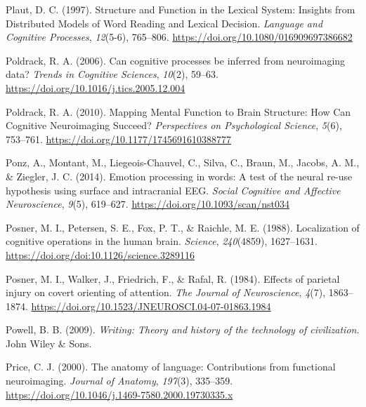 \documentclass[
  a4paper,12pt,twoside,onecolumn,openright,final,oldfontcommands]{memoir}
\newlength{\cslhangindent}
\newlength{\cslentryspacingunit} %
\newenvironment{CSLReferences}[2] %
 {%
  \setlength{\parindent}{0pt}
  \ifodd #1
  \let\oldpar\par
  \def\par{\hangindent=\cslhangindent\oldpar}
  \fi
  \setlength{\parskip}{#2\cslentryspacingunit}
 }%
 {}
\begin{document}
\begin{CSLReferences}{1}{0}
\leavevmode{}%
Plaut, D. C. (1997). Structure and {Function} in the {Lexical} {System}: {Insights} from {Distributed} {Models} of {Word} {Reading} and {Lexical} {Decision}. \emph{Language and Cognitive Processes}, \emph{12}(5-6), 765--806. \url{https://doi.org/10.1080/016909697386682}

\leavevmode{}%
Poldrack, R. A. (2006). Can cognitive processes be inferred from neuroimaging data? \emph{Trends in Cognitive Sciences}, \emph{10}(2), 59--63. \url{https://doi.org/10.1016/j.tics.2005.12.004}

\leavevmode{}%
Poldrack, R. A. (2010). Mapping {Mental} {Function} to {Brain} {Structure}: {How} {Can} {Cognitive} {Neuroimaging} {Succeed}? \emph{Perspectives on Psychological Science}, \emph{5}(6), 753--761. \url{https://doi.org/10.1177/1745691610388777}

\leavevmode{}%
Ponz, A., Montant, M., Liegeois-Chauvel, C., Silva, C., Braun, M., Jacobs, A. M., \& Ziegler, J. C. (2014). Emotion processing in words: A test of the neural re-use hypothesis using surface and intracranial {EEG}. \emph{Social Cognitive and Affective Neuroscience}, \emph{9}(5), 619--627. \url{https://doi.org/10.1093/scan/nst034}

\leavevmode{}%
Posner, M. I., Petersen, S. E., Fox, P. T., \& Raichle, M. E. (1988). Localization of cognitive operations in the human brain. \emph{Science}, \emph{240}(4859), 1627--1631. \url{https://doi.org/doi:10.1126/science.3289116}

\leavevmode{}%
Posner, M. I., Walker, J., Friedrich, F., \& Rafal, R. (1984). Effects of parietal injury on covert orienting of attention. \emph{The Journal of Neuroscience}, \emph{4}(7), 1863--1874. \url{https://doi.org/10.1523/JNEUROSCI.04-07-01863.1984}

\leavevmode{}%
Powell, B. B. (2009). \emph{Writing: {Theory} and history of the technology of civilization}. John Wiley \& Sons.

\leavevmode{}%
Price, C. J. (2000). The anatomy of language: Contributions from functional neuroimaging. \emph{Journal of Anatomy}, \emph{197}(3), 335--359. \url{https://doi.org/10.1046/j.1469-7580.2000.19730335.x}


\end{CSLReferences}
\end{document}

